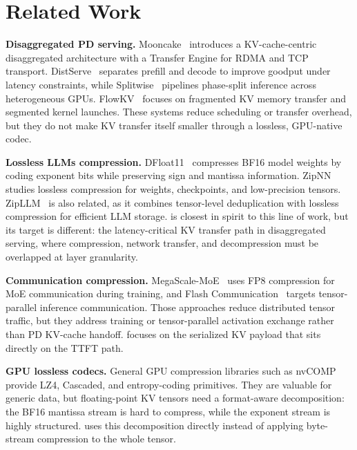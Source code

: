 \section{Related Work}
\label{sec:related}

\textbf{Disaggregated PD serving.}
Mooncake~\cite{qin2024mooncake} introduces a KV-cache-centric disaggregated architecture with a Transfer Engine for RDMA and TCP transport.
DistServe~\cite{distserve} separates prefill and decode to improve goodput under latency constraints, while Splitwise~\cite{splitwise} pipelines phase-split inference across heterogeneous GPUs.
FlowKV~\cite{flowkv} focuses on fragmented KV memory transfer and segmented kernel launches.
These systems reduce scheduling or transfer overhead, but they do not make KV transfer itself smaller through a lossless, GPU-native codec.

\textbf{Lossless LLMs compression.}
DFloat11~\cite{dfloat11} compresses BF16 model weights by coding exponent bits while preserving sign and mantissa information. ZipNN~\cite{zipnn} studies lossless compression for weights, checkpoints, and low-precision tensors. ZipLLM~\cite{zipllm} is also related, as it combines tensor-level deduplication with lossless compression for efficient LLM storage.
\splitzip is closest in spirit to this line of work, but its target is different: the latency-critical KV transfer path in disaggregated serving, where compression, network transfer, and decompression must be overlapped at layer granularity.

\textbf{Communication compression.}
MegaScale-MoE~\cite{megascalemoe} uses FP8 compression for MoE communication during training, and Flash Communication~\cite{flashcomm} targets tensor-parallel inference communication.
Those approaches reduce distributed tensor traffic, but they address training or tensor-parallel activation exchange rather than PD KV-cache handoff.
\splitzip focuses on the serialized KV payload that sits directly on the TTFT path.

\textbf{GPU lossless codecs.}
General GPU compression libraries such as nvCOMP provide LZ4\cite{nvidia2026nvcomp}, Cascaded, and entropy-coding primitives.
They are valuable for generic data, but floating-point KV tensors need a format-aware decomposition: the BF16 mantissa stream is hard to compress, while the exponent stream is highly structured.
\splitzip uses this decomposition directly instead of applying byte-stream compression to the whole tensor.
